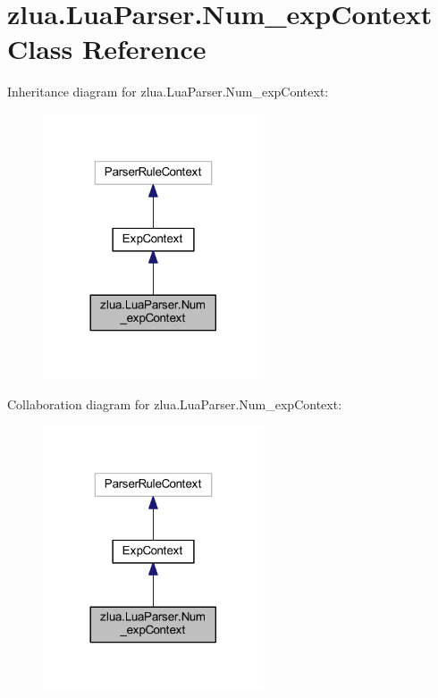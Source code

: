 \hypertarget{classzlua_1_1_lua_parser_1_1_num__exp_context}{}\section{zlua.\+Lua\+Parser.\+Num\+\_\+exp\+Context Class Reference}
\label{classzlua_1_1_lua_parser_1_1_num__exp_context}


Inheritance diagram for zlua.\+Lua\+Parser.\+Num\+\_\+exp\+Context\+:
\nopagebreak
\begin{figure}[H]
\begin{center}
\leavevmode
\includegraphics[width=185pt]{classzlua_1_1_lua_parser_1_1_num__exp_context__inherit__graph}
\end{center}
\end{figure}


Collaboration diagram for zlua.\+Lua\+Parser.\+Num\+\_\+exp\+Context\+:
\nopagebreak
\begin{figure}[H]
\begin{center}
\leavevmode
\includegraphics[width=185pt]{classzlua_1_1_lua_parser_1_1_num__exp_context__coll__graph}
\end{center}
\end{figure}
